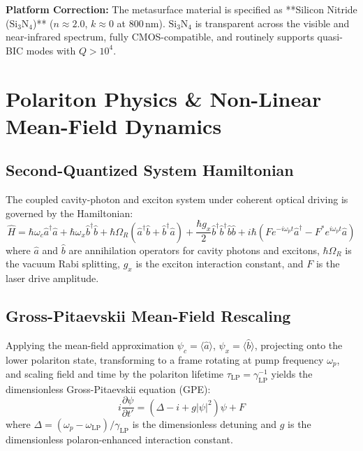 \documentclass[11pt,oneside]{article}
\begin{document}
\begin{resultbox}
\textbf{Platform Correction:} The metasurface material is specified as **Silicon Nitride ($\text{Si}_3\text{N}_4$)** ($n \approx 2.0$, $k \approx 0$ at $800\,\text{nm}$). $\text{Si}_3\text{N}_4$ is transparent across the visible and near-infrared spectrum, fully CMOS-compatible, and routinely supports quasi-BIC modes with $Q > 10^4$.
\end{resultbox}

\section{Polariton Physics \& Non-Linear Mean-Field Dynamics}
\label{sec:polariton_physics}

\subsection{Second-Quantized System Hamiltonian}

The coupled cavity-photon and exciton system under coherent optical driving is governed by the Hamiltonian:
\begin{equation}
\hat{H} = \hbar \omega_c \hat{a}^\dagger \hat{a} + \hbar \omega_x \hat{b}^\dagger \hat{b} + \hbar \Omega_R \left(\hat{a}^\dagger \hat{b} + \hat{b}^\dagger \hat{a}\right) + \frac{\hbar g_x}{2} \hat{b}^\dagger \hat{b}^\dagger \hat{b} \hat{b} + i\hbar \left(F e^{-i\omega_p t} \hat{a}^\dagger - F^* e^{i\omega_p t} \hat{a}\right)
\end{equation}
where $\hat{a}$ and $\hat{b}$ are annihilation operators for cavity photons and excitons, $\hbar \Omega_R$ is the vacuum Rabi splitting, $g_x$ is the exciton interaction constant, and $F$ is the laser drive amplitude.

\subsection{Gross-Pitaevskii Mean-Field Rescaling}

Applying the mean-field approximation $\psi_c = \langle \hat{a} \rangle$, $\psi_x = \langle \hat{b} \rangle$, projecting onto the lower polariton state, transforming to a frame rotating at pump frequency $\omega_p$, and scaling field and time by the polariton lifetime $\tau_{\text{LP}} = \gamma_{\text{LP}}^{-1}$ yields the dimensionless Gross-Pitaevskii equation (GPE):
\begin{equation}
i \frac{\partial \psi}{\partial t'} = \left(\Delta - i + g |\psi|^2\right) \psi + F
\label{eq:gpe_dimensionless}
\end{equation}
where $\Delta = (\omega_p - \omega_{\text{LP}}) / \gamma_{\text{LP}}$ is the dimensionless detuning and $g$ is the dimensionless polaron-enhanced interaction constant.
\end{document}
